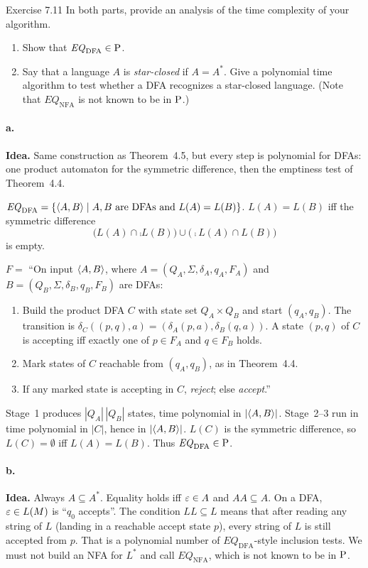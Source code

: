 \begin{question}{Exercise 7.11}
In both parts, provide an analysis of the time complexity of your algorithm.
\begin{enumerate}[label=\alph*.]
\item Show that $\mathit{EQ}_{\mathrm{DFA}}\in\mathrm{P}$.
\item Say that a language $A$ is \emph{star-closed} if $A=A^*$. Give a polynomial time algorithm to test whether a DFA recognizes a star-closed language. (Note that $\mathit{EQ}_{\mathrm{NFA}}$ is not known to be in $\mathrm{P}$.)
\end{enumerate}
\end{question}
\begin{soln}
\paragraph{a.}
\textbf{Idea.} Same construction as Theorem~4.5, but every step is polynomial for DFAs: one product automaton for the symmetric difference, then the emptiness test of Theorem~4.4.

$\mathit{EQ}_{\mathrm{DFA}}=\{\langle A,B\rangle\mid \text{$A,B$ are DFAs and $L(A)=L(B)$}\}$.
$L(A)=L(B)$ iff the symmetric difference
\[
\bigl(L(A)\cap\comp{L(B)}\bigr)\cup\bigl(\comp{L(A)}\cap L(B)\bigr)
\]
is empty.

$F=$ ``On input $\langle A,B\rangle$, where $A=(Q_A,\Sigma,\delta_A,q_A,F_A)$ and $B=(Q_B,\Sigma,\delta_B,q_B,F_B)$ are DFAs:
\begin{enumerate}
\item Build the product DFA $C$ with state set $Q_A\times Q_B$ and start $(q_A,q_B)$.
The transition is $\delta_C((p,q),a)=(\delta_A(p,a),\delta_B(q,a))$.
A state $(p,q)$ of $C$ is accepting iff exactly one of $p\in F_A$ and $q\in F_B$ holds.
\item Mark states of $C$ reachable from $(q_A,q_B)$, as in Theorem~4.4.
\item If any marked state is accepting in $C$, \emph{reject}; else \emph{accept}.''
\end{enumerate}

Stage~1 produces $|Q_A|\,|Q_B|$ states, time polynomial in $|\langle A,B\rangle|$.
Stage~2--3 run in time polynomial in $|C|$, hence in $|\langle A,B\rangle|$.
$L(C)$ is the symmetric difference, so $L(C)=\emptyset$ iff $L(A)=L(B)$. Thus $\mathit{EQ}_{\mathrm{DFA}}\in\mathrm{P}$.

\paragraph{b.}
\textbf{Idea.} Always $A\subseteq A^*$. Equality holds iff $\varepsilon\in A$ and $AA\subseteq A$. On a DFA, $\varepsilon\in L(M)$ is ``$q_0$ accepts''. The condition $LL\subseteq L$ means that after reading any string of $L$ (landing in a reachable accept state $p$), every string of $L$ is still accepted from $p$. That is a polynomial number of $\mathit{EQ}_{\mathrm{DFA}}$-style inclusion tests. We must not build an NFA for $L^*$ and call $\mathit{EQ}_{\mathrm{NFA}}$, which is not known to be in $\mathrm{P}$.


\end{soln}
